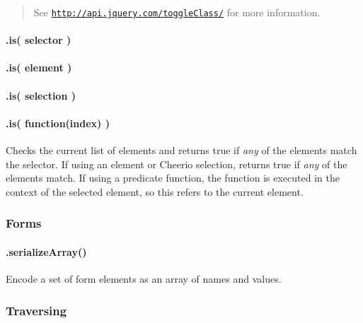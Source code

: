 \begin{quote}
See \href{http://api.jquery.com/toggleClass/}{\tt http\+://api.\+jquery.\+com/toggle\+Class/} for more information. \end{quote}


\paragraph*{.is( selector )}

\paragraph*{.is( element )}

\paragraph*{.is( selection )}

\paragraph*{.is( function(index) )}

Checks the current list of elements and returns {\ttfamily true} if {\itshape any} of the elements match the selector. If using an element or Cheerio selection, returns {\ttfamily true} if {\itshape any} of the elements match. If using a predicate function, the function is executed in the context of the selected element, so {\ttfamily this} refers to the current element.

\subsubsection*{Forms}

\paragraph*{.serialize\+Array()}

Encode a set of form elements as an array of names and values.




\subsubsection*{Traversing}

